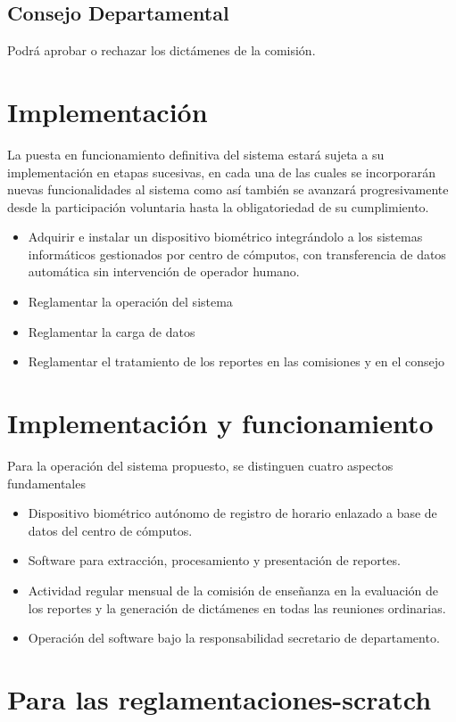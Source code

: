 \documentclass[a4paper, 11pt]{article} %
\begin{document}
\subsection*{Consejo Departamental}
Podrá aprobar o rechazar los dictámenes de la comisión.

\section*{Implementación}
La puesta en funcionamiento definitiva del sistema estará sujeta a su implementación en etapas sucesivas, en cada una de las cuales se incorporarán nuevas funcionalidades al sistema como así también se avanzará progresivamente desde la participación voluntaria hasta la obligatoriedad de su cumplimiento.\\

\begin{itemize}
	\item Adquirir e instalar un dispositivo biométrico integrándolo a los sistemas informáticos gestionados por centro de cómputos, con transferencia de datos automática sin intervención de operador humano.
	\item Reglamentar la operación del sistema
	\item Reglamentar la carga de datos
	\item Reglamentar el tratamiento de los reportes en las comisiones y en el consejo
\end{itemize}
\newpage
\section*{Implementación y funcionamiento}
Para la operación del sistema propuesto, se distinguen cuatro aspectos fundamentales
\begin{itemize}
	\item Dispositivo biométrico autónomo de registro de horario enlazado a base de datos del centro de cómputos.
	\item Software para extracción, procesamiento y presentación de reportes.
	\item Actividad regular mensual de la comisión de enseñanza en la evaluación de los reportes y la generación de dictámenes en todas las reuniones ordinarias.
	\item Operación del software bajo la responsabilidad secretario de departamento.
\end{itemize}
\section{Para las reglamentaciones-scratch}
\end{document}

